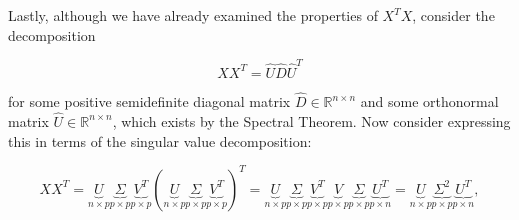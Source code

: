 %
%
%
%
%
%
%

Lastly, although we have already examined the properties of \(X^TX\), consider the decomposition

\begin{equation}\label{linalg.svd.5.decomp}
XX^T = \hat{U} \hat{D} \hat{U}^T
\end{equation}

for some positive semidefinite diagonal matrix \(\hat{D} \in \mathbb{R}^{n \times n}\) and some orthonormal matrix \(\hat{U} \in \mathbb{R}^{n \times n}\), which exists by the Spectral Theorem. Now consider expressing this in terms of the singular value decomposition:

\begin{equation}\label{linalg.svd.6.decomp}
XX^T =  \underbrace{U}_{n \times p} \underbrace{\Sigma}_{p \times p} \underbrace{V^T}_{p \times p} (\underbrace{U}_{n \times p} \underbrace{\Sigma}_{p \times p} \underbrace{V^T}_{p \times p})^T
=  \underbrace{U}_{n \times p} \underbrace{\Sigma}_{p \times p} \underbrace{V^T}_{p \times p} \underbrace{V}_{p \times p} \underbrace{\Sigma}_{p \times p}  \underbrace{U^T}_{p \times n} = \underbrace{U}_{n \times p} \underbrace{\Sigma^2}_{p \times p}  \underbrace{U^T}_{p \times n},
\end{equation}

